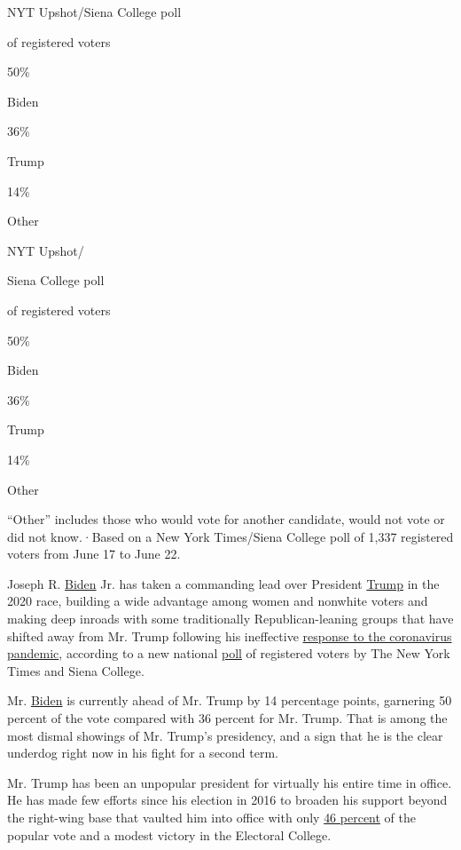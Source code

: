 NYT Upshot/Siena College poll

of registered voters

50\%

Biden

36\%

Trump

14\%

Other

NYT Upshot/

Siena College poll

of registered voters

50\%

Biden

36\%

Trump

14\%

Other

``Other'' includes those who would vote for another candidate, would not
vote or did not know.·Based on a New York Times/Siena College poll of
1,337 registered voters from June 17 to June 22.

Joseph R.
\href{https://www.nytimes3xbfgragh.onion/2020/07/17/us/trump-biden-2020-election.html}{Biden}
Jr. has taken a commanding lead over President
\href{https://www.nytimes3xbfgragh.onion/2020/07/17/us/trump-biden-2020-election.html}{Trump}
in the 2020 race, building a wide advantage among women and nonwhite
voters and making deep inroads with some traditionally
Republican-leaning groups that have shifted away from Mr. Trump
following his ineffective
\href{https://www.nytimes3xbfgragh.onion/2020/04/11/us/politics/coronavirus-trump-response.html}{response
to the coronavirus pandemic}, according to a new national
\href{https://www.nytimes3xbfgragh.onion/2020/07/20/upshot/biden-trump-poll.html}{poll}
of registered voters by The New York Times and Siena College.

Mr.
\href{https://www.nytimes3xbfgragh.onion/2020/07/03/upshot/joe-biden-voters-coronavirus.html}{Biden}
is currently ahead of Mr. Trump by 14 percentage points, garnering 50
percent of the vote compared with 36 percent for Mr. Trump. That is
among the most dismal showings of Mr. Trump's presidency, and a sign
that he is the clear underdog right now in his fight for a second term.

Mr. Trump has been an unpopular president for virtually his entire time
in office. He has made few efforts since his election in 2016 to broaden
his support beyond the right-wing base that vaulted him into office with
only
\href{https://www.nytimes3xbfgragh.onion/elections/2016/results/president}{46
percent} of the popular vote and a modest victory in the Electoral
College.

